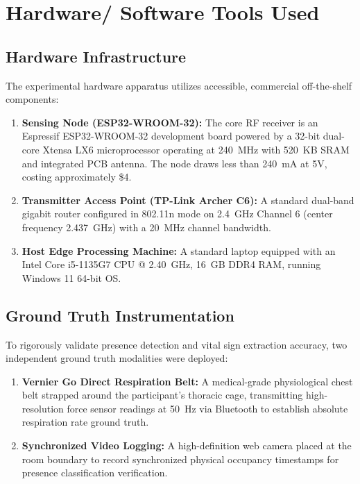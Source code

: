 \chapter{Hardware/ Software Tools Used}
\label{chap:tools}

\section{Hardware Infrastructure}
The experimental hardware apparatus utilizes accessible, commercial off-the-shelf components:
\begin{enumerate}
    \item \textbf{Sensing Node (ESP32-WROOM-32):} The core RF receiver is an Espressif ESP32-WROOM-32 development board powered by a 32-bit dual-core Xtensa LX6 microprocessor operating at 240~MHz with 520~KB SRAM and integrated PCB antenna. The node draws less than 240~mA at 5V, costing approximately \$4.
    \item \textbf{Transmitter Access Point (TP-Link Archer C6):} A standard dual-band gigabit router configured in 802.11n mode on 2.4~GHz Channel 6 (center frequency 2.437~GHz) with a 20~MHz channel bandwidth.
    \item \textbf{Host Edge Processing Machine:} A standard laptop equipped with an Intel Core i5-1135G7 CPU @ 2.40~GHz, 16~GB DDR4 RAM, running Windows 11 64-bit OS.
\end{enumerate}

\section{Ground Truth Instrumentation}
To rigorously validate presence detection and vital sign extraction accuracy, two independent ground truth modalities were deployed:
\begin{enumerate}
    \item \textbf{Vernier Go Direct Respiration Belt:} A medical-grade physiological chest belt strapped around the participant's thoracic cage, transmitting high-resolution force sensor readings at 50~Hz via Bluetooth to establish absolute respiration rate ground truth.
    \item \textbf{Synchronized Video Logging:} A high-definition web camera placed at the room boundary to record synchronized physical occupancy timestamps for presence classification verification.
\end{enumerate}

